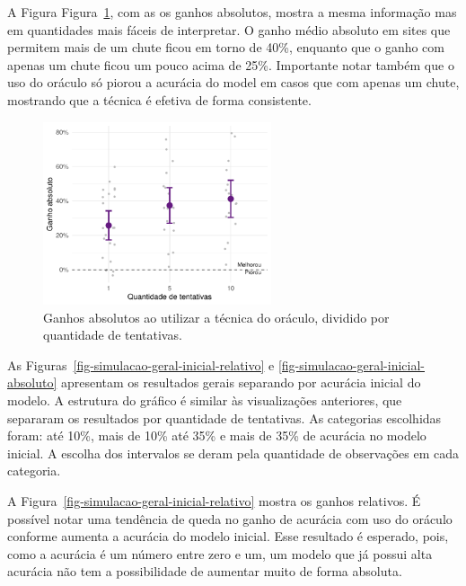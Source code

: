 \documentclass[12pt,twoside,brazilian]{book}
\begin{document}
A Figura Figura~\ref{fig-simulacao-geral-ntry-absoluto}, com as os
ganhos absolutos, mostra a mesma informação mas em quantidades mais
fáceis de interpretar. O ganho médio absoluto em sites que permitem mais
de um chute ficou em torno de 40\%, enquanto que o ganho com apenas um
chute ficou um pouco acima de 25\%. Importante notar também que o uso do
oráculo só piorou a acurácia do model em casos que com apenas um chute,
mostrando que a técnica é efetiva de forma consistente.

\begin{figure}

{\centering \includegraphics[width=0.6\textwidth,height=\textheight]{./resultados_files/figure-pdf/fig-simulacao-geral-ntry-absoluto-1.pdf}

}

\caption{\label{fig-simulacao-geral-ntry-absoluto}Ganhos absolutos ao
utilizar a técnica do oráculo, dividido por quantidade de tentativas.}

\end{figure}

As Figuras~\ref{fig-simulacao-geral-inicial-relativo} e
\ref{fig-simulacao-geral-inicial-absoluto} apresentam os resultados
gerais separando por acurácia inicial do modelo. A estrutura do gráfico
é similar às visualizações anteriores, que separaram os resultados por
quantidade de tentativas. As categorias escolhidas foram: até 10\%, mais
de 10\% até 35\% e mais de 35\% de acurácia no modelo inicial. A escolha
dos intervalos se deram pela quantidade de observações em cada
categoria.

A Figura~\ref{fig-simulacao-geral-inicial-relativo} mostra os ganhos
relativos. É possível notar uma tendência de queda no ganho de acurácia
com uso do oráculo conforme aumenta a acurácia do modelo inicial. Esse
resultado é esperado, pois, como a acurácia é um número entre zero e um,
um modelo que já possui alta acurácia não tem a possibilidade de
aumentar muito de forma absoluta.
\end{document}
